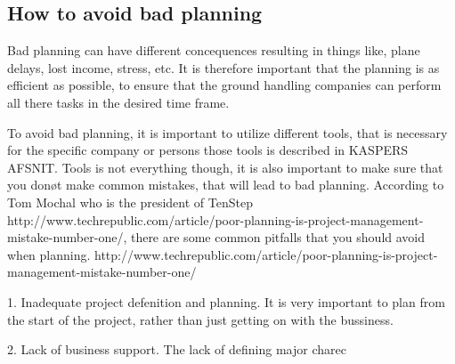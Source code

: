 \subsection{How to avoid bad planning}

Bad planning can have different concequences resulting in things like, plane delays, lost income, stress, etc. It is therefore important that the planning is as efficient as possible, to ensure that the ground handling companies can perform all there tasks in the desired time frame.

To avoid bad planning, it is important to utilize different tools, that is necessary for the specific company or persons those tools is described in KASPERS AFSNIT. Tools is not everything though, it is also important to make sure that you donøt make common mistakes, that will lead to bad planning. According to Tom Mochal who is the president of TenStep http://www.techrepublic.com/article/poor-planning-is-project-management-mistake-number-one/, there are some common pitfalls that you should avoid when planning. http://www.techrepublic.com/article/poor-planning-is-project-management-mistake-number-one/

1. Inadequate project defenition and planning. It is very important to plan from the start of the project, rather than just getting on with the bussiness.

2. Lack of business support. The lack of defining major charec